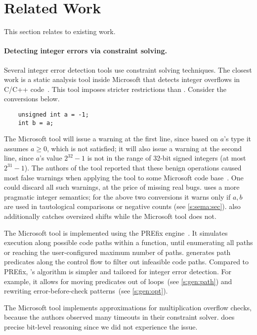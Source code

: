 \section{Related Work}
\label{s:relwk}

This section relates \sys to existing work.

\paragraph{Detecting integer errors via constraint solving.}

Several integer error detection tools use constraint solving
techniques.  The closest work is a static analysis tool inside
Microsoft that detects integer overflows in C/C++ code~\cite{moy:z3prefix}.
This tool imposes stricter restrictions than \sys.
Consider the conversions below.
\begin{Verbatim}
	unsigned int a = -1;
	int b = a;
\end{Verbatim}
The Microsoft tool will issue a warning at the first line,
since based on $a$'s type it assumes $a \geq 0$, which is not satisfied;
it will also issue a warning at the second line,
since $a$'s value $2^{32} - 1$ is not in the range of 32-bit signed integers
(at most $2^{31} - 1$).
The authors of the tool reported that these benign operations caused
most false warnings when applying the tool to some Microsoft code
base~\cite[\subsectionautorefname~6.2]{moy:z3prefix}.
One could discard all such warnings, at the price of
missing real bugs.
\sys uses a more pragmatic integer semantics;
for the above two conversions it warns only if $a, b$ are used in
tautological comparisons or negative counts (see \autoref{s:sema:sec}).
\sys also additionally catches oversized shifts while the Microsoft tool does not.

The Microsoft tool is implemented using the PREfix
engine~\cite{bush:prefix}.  It simulates execution along possible
code paths within a function, until enumerating all paths or reaching
the user-configured maximum number of paths.
%
\sys generates path predicates along the control flow
to filter out infeasible code paths.
Compared to PREfix, \sys's algorithm is simpler
and tailored for integer error detection.  For example, it allows
for moving predicates out of loops~(see \autoref{s:gen:path}) and
rewriting error-before-check patterns~(see \autoref{s:gen:opt}).

The Microsoft tool implements approximations for multiplication
overflow checks, because the authors observed many timeouts in their
constraint solver.  \sys does precise bit-level reasoning
since we did not experience the issue.

